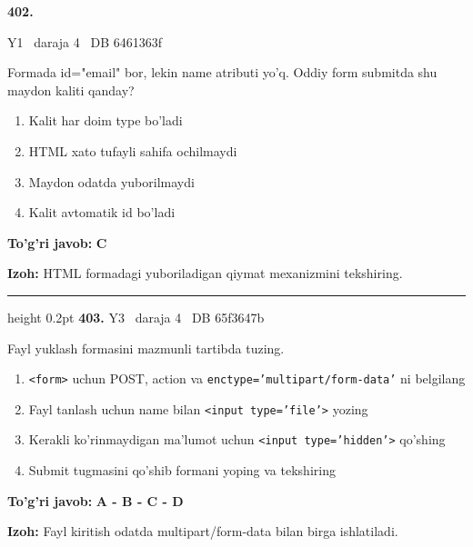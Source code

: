 \documentclass[10pt,a4paper,oneside]{article}
\begin{document}
\hypertarget{q402}{\textbf{\color{ink}402.}}  {\color{muted}\scriptsize Y1 \textbullet\ daraja 4 \textbullet\ DB 6461363f}
\par
Formada id="email" bor, lekin name atributi yo'q. Oddiy form submitda shu maydon kaliti qanday?
\begin{enumerate}[label=\Alph*),leftmargin=9mm]
\item Kalit har doim type bo'ladi
\item HTML xato tufayli sahifa ochilmaydi
\item Maydon odatda yuborilmaydi
\item Kalit avtomatik id bo'ladi
\end{enumerate}
\begin{tcolorbox}[enhanced,breakable,colback=teal!4,colframe=teal!45!black,boxrule=0.45pt,arc=1.2mm,left=2.8mm,right=2.8mm,top=2mm,bottom=2mm,before skip=2mm,after skip=2mm]
\textbf{\color{teal}To'g'ri javob:} \textbf{C}
\par\smallskip
\textbf{Izoh:} HTML formadagi yuboriladigan qiymat mexanizmini tekshiring.
\end{tcolorbox}
\vspace{2mm}\hrule height 0.2pt \vspace{4mm}
\hypertarget{q403}{\textbf{\color{ink}403.}}  {\color{muted}\scriptsize Y3 \textbullet\ daraja 4 \textbullet\ DB 65f3647b}
\par
Fayl yuklash formasini mazmunli tartibda tuzing.
\begin{enumerate}[label=\Alph*),leftmargin=9mm]
\item \texttt{\textless{}form\textgreater{}} uchun POST, action va \texttt{enctype='multipart/form-data'} ni belgilang
\item Fayl tanlash uchun name bilan \texttt{\textless{}input type='file'\textgreater{}} yozing
\item Kerakli ko'rinmaydigan ma'lumot uchun \texttt{\textless{}input type='hidden'\textgreater{}} qo'shing
\item Submit tugmasini qo'shib formani yoping va tekshiring
\end{enumerate}
\begin{tcolorbox}[enhanced,breakable,colback=teal!4,colframe=teal!45!black,boxrule=0.45pt,arc=1.2mm,left=2.8mm,right=2.8mm,top=2mm,bottom=2mm,before skip=2mm,after skip=2mm]
\textbf{\color{teal}To'g'ri javob:} \textbf{A - B - C - D}
\par\smallskip
\textbf{Izoh:} Fayl kiritish odatda multipart/form-data bilan birga ishlatiladi.
\end{tcolorbox}
\end{document}
